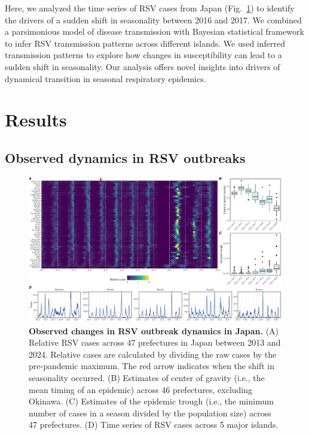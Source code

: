 \documentclass[12pt]{article}
\newcommand{\fref}[1]{Fig.~\ref{fig:#1}}
\begin{document}
Here, we analyzed the time series of RSV cases from Japan (\fref{fig1}) to identify the drivers of a sudden shift in seasonality between 2016 and 2017. 
We combined a parsimonious model of disease transmission with Bayesian statistical framework to infer RSV transmission patterns across different islands.
We used inferred transmission patterns to explore how changes in susceptibility can lead to a sudden shift in seasonality.
Our analysis offers novel insights into drivers of dynamical transition in seasonal respiratory epidemics.

\section*{Results}

\subsection*{Observed dynamics in RSV outbreaks}

\begin{figure}[!th]
\includegraphics[width=\textwidth]{../figure/figure1.pdf}
\caption{
\textbf{Observed changes in RSV outbreak dynamics in Japan.}
(A) Relative RSV cases across 47 prefectures in Japan between 2013 and 2024.
Relative cases are calculated by dividing the raw cases by the pre-pandemic maximum.
The red arrow indicates when the shift in seasonality occurred.
(B) Estimates of center of gravity (i.e., the mean timing of an epidemic) across 46 prefectures, excluding Okinawa.
(C) Estimates of the epidemic trough (i.e., the minimum number of cases in a season divided by the population size) across 47 prefectures.
(D) Time series of RSV cases across 5 major islands.
}
\label{fig:fig1}
\end{figure}
\end{document}
